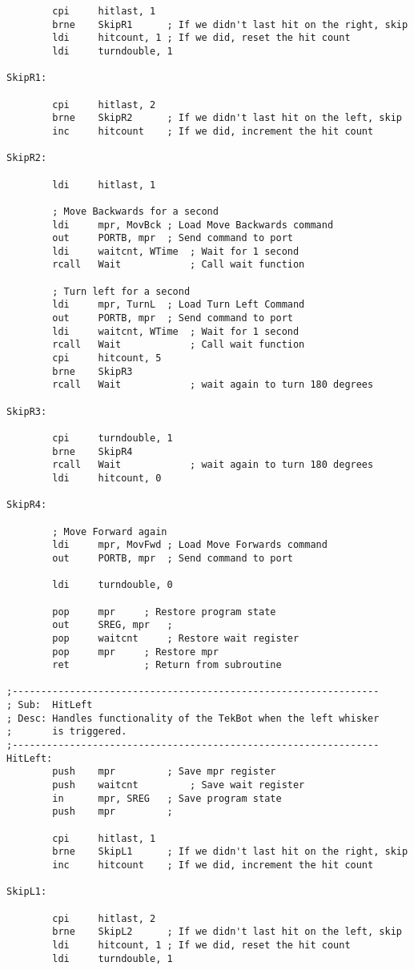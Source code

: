 \documentclass[12pt,letterpaper]{article}
\begin{document}
\begin{verbatim}
        cpi     hitlast, 1
        brne    SkipR1      ; If we didn't last hit on the right, skip
        ldi     hitcount, 1 ; If we did, reset the hit count
		ldi		turndouble, 1

SkipR1:

        cpi     hitlast, 2
        brne    SkipR2      ; If we didn't last hit on the left, skip
        inc     hitcount    ; If we did, increment the hit count

SkipR2:

        ldi     hitlast, 1

		; Move Backwards for a second
		ldi		mpr, MovBck	; Load Move Backwards command
		out		PORTB, mpr	; Send command to port
		ldi		waitcnt, WTime	; Wait for 1 second
		rcall	Wait			; Call wait function

		; Turn left for a second
		ldi		mpr, TurnL	; Load Turn Left Command
		out		PORTB, mpr	; Send command to port
		ldi		waitcnt, WTime	; Wait for 1 second
		rcall	Wait			; Call wait function
        cpi     hitcount, 5
        brne    SkipR3
		rcall	Wait			; wait again to turn 180 degrees

SkipR3:

		cpi     turndouble, 1
        brne    SkipR4
		rcall	Wait			; wait again to turn 180 degrees
        ldi     hitcount, 0

SkipR4:

		; Move Forward again	
		ldi		mpr, MovFwd	; Load Move Forwards command
		out		PORTB, mpr	; Send command to port

		ldi		turndouble, 0

		pop		mpr		; Restore program state
		out		SREG, mpr	;
		pop		waitcnt		; Restore wait register
		pop		mpr		; Restore mpr
		ret				; Return from subroutine

;----------------------------------------------------------------
; Sub:	HitLeft
; Desc:	Handles functionality of the TekBot when the left whisker
;		is triggered.
;----------------------------------------------------------------
HitLeft:
		push	mpr			; Save mpr register
		push	waitcnt			; Save wait register
		in		mpr, SREG	; Save program state
		push	mpr			;

        cpi     hitlast, 1
        brne    SkipL1      ; If we didn't last hit on the right, skip
        inc     hitcount    ; If we did, increment the hit count

SkipL1:

        cpi     hitlast, 2
        brne    SkipL2      ; If we didn't last hit on the left, skip
        ldi     hitcount, 1 ; If we did, reset the hit count
		ldi		turndouble, 1


\end{verbatim}
\end{document}
